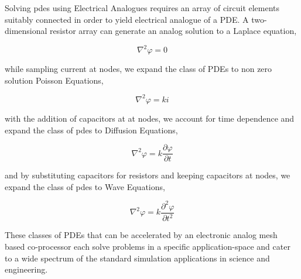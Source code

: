 Solving \acrshort{pde}s using Electrical Analogues requires an array of circuit elements suitably connected in order to yield electrical analogue of a PDE. A two-dimensional resistor array can generate an analog solution to a Laplace equation,

\begin{equation}\label{Laplace}
\nabla^2 \varphi = 0
\end{equation}

while sampling current at nodes, we expand the class of PDEs to non zero solution Poisson Equations,

\begin{equation}\label{Poisson}
\nabla^2 \varphi = ki
\end{equation}

with the addition of capacitors at at nodes, we account for time dependence and expand the class of \acrshort{pde}s to Diffusion Equations,

\begin{equation}\label{Diffusion}
\nabla^2 \varphi = k \frac{\partial \varphi}{\partial t }
\end{equation}

and by substituting capacitors for resistors and keeping capacitors at nodes, we expand the class of \acrshort{pde}s to Wave Equations,

\begin{equation}\label{Wave}
\nabla^2 \varphi = k \frac{\partial^2 \varphi}{\partial t^2}
\end{equation}

These classes of PDEs that can be accelerated by an electronic analog mesh based co-processor each solve problems in a specific application-space and cater to a wide spectrum of the standard simulation applications in science and engineering. 

